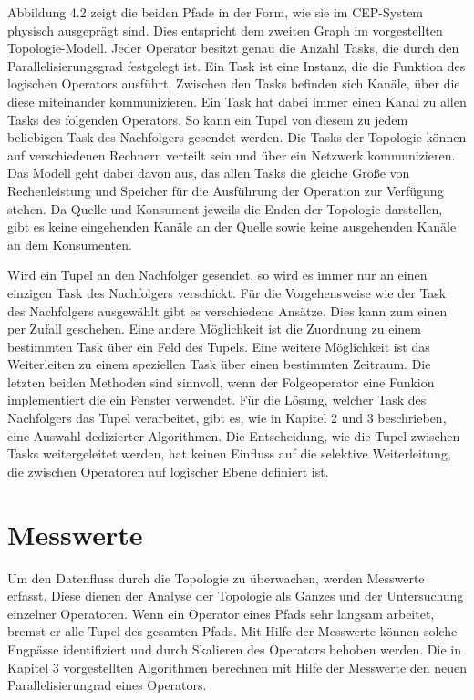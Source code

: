 Abbildung 4.2 zeigt die beiden Pfade in der Form, wie sie im CEP-System physisch ausgeprägt sind.
Dies entspricht dem zweiten Graph im vorgestellten Topologie-Modell.
Jeder Operator besitzt genau die Anzahl Tasks, die durch den Parallelisierungsgrad festgelegt ist.
Ein Task ist eine Instanz, die die Funktion des logischen Operators ausführt.
Zwischen den Tasks befinden sich Kanäle, über die diese miteinander kommunizieren.
Ein Task hat dabei immer einen Kanal zu allen Tasks des folgenden Operators.
So kann ein Tupel von diesem zu jedem beliebigen Task des Nachfolgers gesendet werden.
Die Tasks der Topologie können auf verschiedenen Rechnern verteilt sein und über ein Netzwerk kommunizieren.
Das Modell geht dabei davon aus, das allen Tasks die gleiche Größe von Rechenleistung und Speicher für die Ausführung der Operation zur Verfügung stehen.
Da Quelle und Konsument jeweils die Enden der Topologie darstellen, gibt es keine eingehenden Kanäle an der Quelle sowie keine ausgehenden Kanäle an dem Konsumenten.

Wird ein Tupel an den Nachfolger gesendet, so wird es immer nur an einen einzigen Task des Nachfolgers verschickt.
Für die Vorgehensweise wie der Task des Nachfolgers ausgewählt gibt es verschiedene Ansätze.
Dies kann zum einen per Zufall geschehen.
Eine andere Möglichkeit ist die Zuordnung zu einem bestimmten Task über ein Feld des Tupels.
Eine weitere Möglichkeit ist das Weiterleiten zu einem speziellen Task über einen bestimmten Zeitraum.
Die letzten beiden Methoden sind sinnvoll, wenn der Folgeoperator eine Funkion implementiert die ein Fenster verwendet.
Für die Lösung, welcher Task des Nachfolgers das Tupel verarbeitet, gibt es, wie in Kapitel 2 und 3 beschrieben, eine Auswahl dedizierter Algorithmen.
Die Entscheidung, wie die Tupel zwischen Tasks weitergeleitet werden, hat keinen Einfluss auf die selektive Weiterleitung, die zwischen Operatoren auf logischer Ebene definiert ist.

\section{Messwerte}

Um den Datenfluss durch die Topologie zu überwachen, werden Messwerte erfasst.
Diese dienen der Analyse der Topologie als Ganzes und der Untersuchung einzelner Operatoren.
Wenn ein Operator eines Pfads sehr langsam arbeitet, bremst er alle Tupel des gesamten Pfads.
Mit Hilfe der Messwerte können solche Engpässe identifiziert und durch Skalieren des Operators behoben werden.
Die in Kapitel 3 vorgestellten Algorithmen berechnen mit Hilfe der Messwerte den neuen Parallelisierungrad eines Operators.


